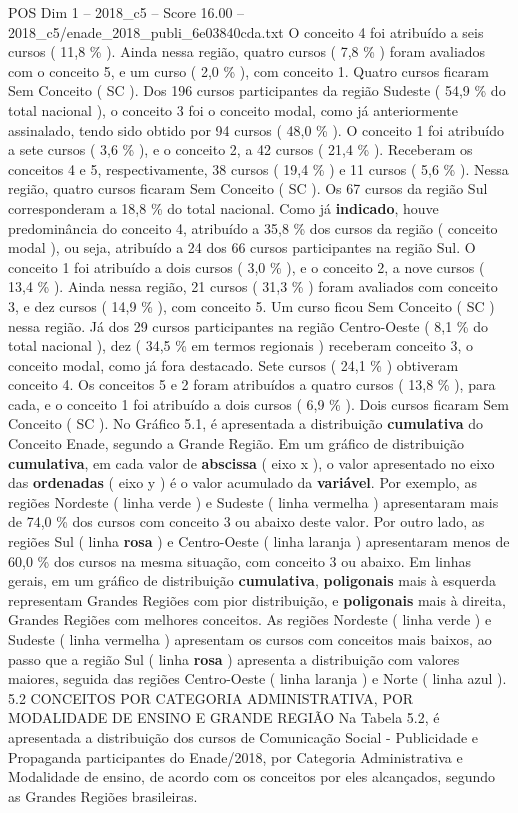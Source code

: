 \begin{textsample}{POS Dim 1 – 2018\_c5 – Score 16.00 – 2018\_c5/enade\_2018\_publi\_6e03840cda.txt}
O conceito 4 foi atribuído a seis cursos ( 11,8 \% ).
Ainda nessa região, quatro cursos ( 7,8 \% ) foram avaliados com o conceito 5, e um curso ( 2,0 \% ), com conceito 1.
Quatro cursos ficaram Sem Conceito ( SC ).
Dos 196 cursos participantes da região Sudeste ( 54,9 \% do total nacional ), o conceito 3 foi o conceito modal, como já anteriormente assinalado, tendo sido obtido por 94 cursos ( 48,0 \% ).
O conceito 1 foi atribuído a sete cursos ( 3,6 \% ), e o conceito 2, a 42 cursos ( 21,4 \% ).
Receberam os conceitos 4 e 5, respectivamente, 38 cursos ( 19,4 \% ) e 11 cursos ( 5,6 \% ).
Nessa região, quatro cursos ficaram Sem Conceito ( SC ).
Os 67 cursos da região Sul corresponderam a 18,8 \% do total nacional.
Como já \textbf{indicado}, houve predominância do conceito 4, atribuído a 35,8 \% dos cursos da região ( conceito modal ), ou seja, atribuído a 24 dos 66 cursos participantes na região Sul.
O conceito 1 foi atribuído a dois cursos ( 3,0 \% ), e o conceito 2, a nove cursos ( 13,4 \% ).
Ainda nessa região, 21 cursos ( 31,3 \% ) foram avaliados com conceito 3, e dez cursos ( 14,9 \% ), com conceito 5.
Um curso ficou Sem Conceito ( SC ) nessa região.
Já dos 29 cursos participantes na região Centro-Oeste ( 8,1 \% do total nacional ), dez ( 34,5 \% em termos regionais ) receberam conceito 3, o conceito modal, como já fora destacado.
Sete cursos ( 24,1 \% ) obtiveram conceito 4.
Os conceitos 5 e 2 foram atribuídos a quatro cursos ( 13,8 \% ), para cada, e o conceito 1 foi atribuído a dois cursos ( 6,9 \% ).
Dois cursos ficaram Sem Conceito ( SC ).
No Gráfico 5.1, é apresentada a distribuição \textbf{cumulativa} do Conceito Enade, segundo a Grande Região.
Em um gráfico de distribuição \textbf{cumulativa}, em cada valor de \textbf{abscissa} ( eixo x ), o valor apresentado no eixo das \textbf{ordenadas} ( eixo y ) é o valor acumulado da \textbf{variável}.
Por exemplo, as regiões Nordeste ( linha verde ) e Sudeste ( linha vermelha ) apresentaram mais de 74,0 \% dos cursos com conceito 3 ou abaixo deste valor.
Por outro lado, as regiões Sul ( linha \textbf{rosa} ) e Centro-Oeste ( linha laranja ) apresentaram menos de 60,0 \% dos cursos na mesma situação, com conceito 3 ou abaixo.
Em linhas gerais, em um gráfico de distribuição \textbf{cumulativa}, \textbf{poligonais} mais à esquerda representam Grandes Regiões com pior distribuição, e \textbf{poligonais} mais à direita, Grandes Regiões com melhores conceitos.
As regiões Nordeste ( linha verde ) e Sudeste ( linha vermelha ) apresentam os cursos com conceitos mais baixos, ao passo que a região Sul ( linha \textbf{rosa} ) apresenta a distribuição com valores maiores, seguida das regiões Centro-Oeste ( linha laranja ) e Norte ( linha azul ). 5.2 CONCEITOS POR CATEGORIA ADMINISTRATIVA, POR MODALIDADE DE ENSINO E GRANDE REGIÃO Na Tabela 5.2, é apresentada a distribuição dos cursos de Comunicação Social - Publicidade e Propaganda participantes do Enade/2018, por Categoria Administrativa e Modalidade de ensino, de acordo com os conceitos por eles alcançados, segundo as Grandes Regiões brasileiras.

\end{textsample}
